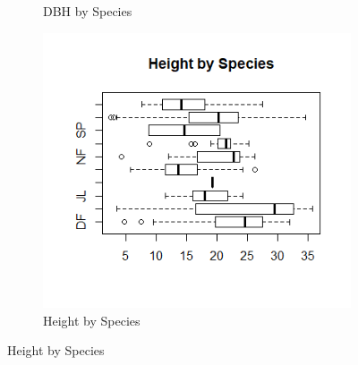 \documentclass[a4paper,11pt,twoside]{report}
\begin{document}
\begin{figure}[h]
\begin{subfigure}{.5\textwidth}
  \caption{DBH by Species}
  \label{fig:DBH_Species}
\end{subfigure}%
\begin{subfigure}{.5\textwidth}
  \centering
 \includegraphics[width=1\linewidth]{Images/HeightBySpecies.png}
  \caption{Height by Species}
  \label{fig:Height_Species}
\end{subfigure}
\label{fig:SpeciesRelationship}
\end{figure}

\begin{figure}[t]
    
\end{figure}
\end{document}
